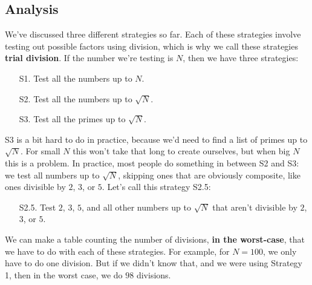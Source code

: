 \documentclass[11pt,paper=letter]{scrartcl}
\begin{document}
\subsection{Analysis}

We've discussed three different strategies so far. Each of these strategies involve testing out possible factors using division, which is why we call these strategies \textbf{trial division}. If the number we're testing is $N$, then we have three strategies:
\begin{enumerate}[itemsep=-0.5ex]
  \item[S1.] Test all the numbers up to $N$.
  \item[S2.] Test all the numbers up to $\sqrt{N}$.
  \item[S3.] Test all the primes up to $\sqrt{N}$.
\end{enumerate}
S3 is a bit hard to do in practice, because we'd need to find a list of primes up to $\sqrt{N}$. For small $N$ this won't take that long to create ourselves, but when big $N$ this is a problem. In practice, most people do something in between S2 and S3: we test all numbers up to $\sqrt{N}$, skipping ones that are obviously composite, like ones divisible by $2$, $3$, or $5$. Let's call this strategy S2.5:
\begin{enumerate}
  \item[S2.5.] Test $2$, $3$, $5$, and all other numbers up to $\sqrt{N}$ that aren't divisible by $2$, $3$, or $5$.
\end{enumerate}
We can make a table counting the number of divisions, \textbf{in the worst-case}, that we have to do with each of these strategies. For example, for $N = 100$, we only have to do one division. But if we didn't know that, and we were using Strategy 1, then in the worst case, we do $98$ divisions.
\end{document}
